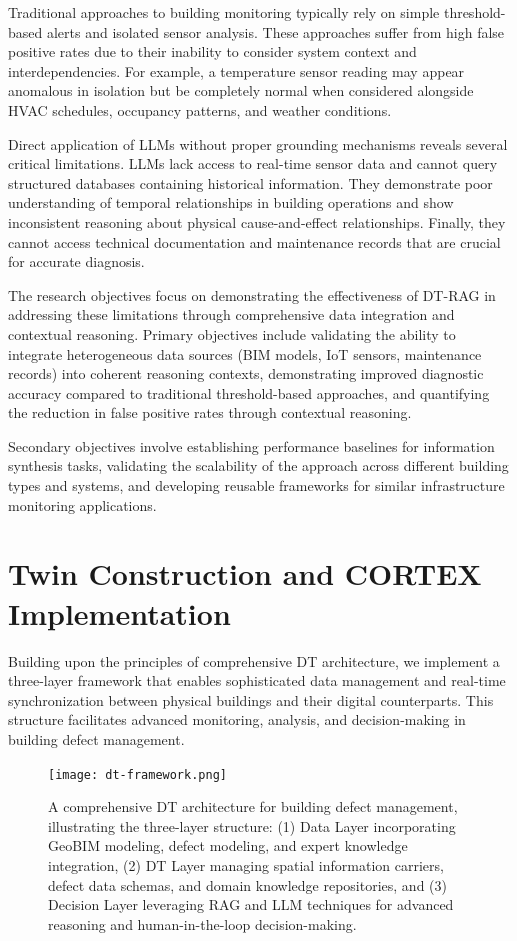 Traditional approaches to building monitoring typically rely on simple threshold-based alerts and isolated sensor analysis. These approaches suffer from high false positive rates due to their inability to consider system context and interdependencies. For example, a temperature sensor reading may appear anomalous in isolation but be completely normal when considered alongside HVAC schedules, occupancy patterns, and weather conditions.

Direct application of LLMs without proper grounding mechanisms reveals several critical limitations. LLMs lack access to real-time sensor data and cannot query structured databases containing historical information. They demonstrate poor understanding of temporal relationships in building operations and show inconsistent reasoning about physical cause-and-effect relationships. Finally, they cannot access technical documentation and maintenance records that are crucial for accurate diagnosis.

The research objectives focus on demonstrating the effectiveness of DT-RAG in addressing these limitations through comprehensive data integration and contextual reasoning. Primary objectives include validating the ability to integrate heterogeneous data sources (BIM models, IoT sensors, maintenance records) into coherent reasoning contexts, demonstrating improved diagnostic accuracy compared to traditional threshold-based approaches, and quantifying the reduction in false positive rates through contextual reasoning.

Secondary objectives involve establishing performance baselines for information synthesis tasks, validating the scalability of the approach across different building types and systems, and developing reusable frameworks for similar infrastructure monitoring applications.

\section{Twin Construction and CORTEX Implementation}

Building upon the principles of comprehensive DT architecture, we implement a three-layer framework that enables sophisticated data management and real-time synchronization between physical buildings and their digital counterparts. This structure facilitates advanced monitoring, analysis, and decision-making in building defect management.

\begin{figure}[htbp]
\centering
\texttt{[image: dt-framework.png]}
\caption{A comprehensive DT architecture for building defect management, illustrating the three-layer structure: (1) Data Layer incorporating GeoBIM modeling, defect modeling, and expert knowledge integration, (2) DT Layer managing spatial information carriers, defect data schemas, and domain knowledge repositories, and (3) Decision Layer leveraging RAG and LLM techniques for advanced reasoning and human-in-the-loop decision-making.}
\label{fig:dt-framework-building}
\end{figure}

